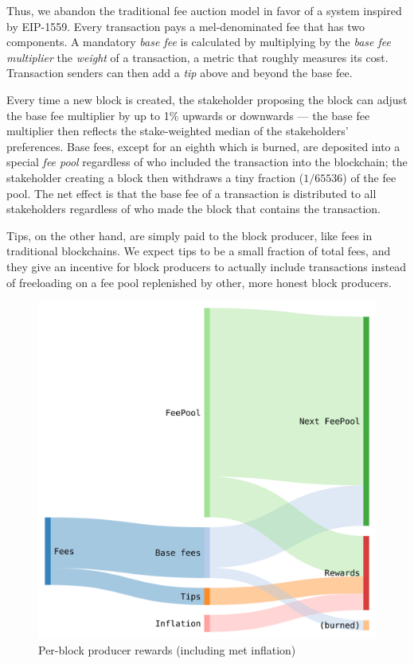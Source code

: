 \documentclass[headinclude]{scrbook}
\begin{document}
Thus, we abandon the traditional fee auction model in favor of a system inspired by EIP-1559. Every transaction pays a mel-denominated fee that has two components. A mandatory \textit{base fee} is calculated by multiplying by the \textit{base fee multiplier} the \textit{weight} of a transaction, a metric that roughly measures its cost. Transaction senders can then add a \textit{tip} above and beyond the base fee.

Every time a new block is created, the stakeholder proposing the block can adjust the base fee multiplier by up to 1\% upwards or downwards --- the base fee multiplier then reflects the stake-weighted median of the stakeholders' preferences. Base fees, except for an eighth which is burned, are deposited into a special \textit{fee pool} regardless of who included the transaction into the blockchain; the stakeholder creating a block then withdraws a tiny fraction ($1/65536$) of the fee pool. The net effect is that the base fee of a transaction is distributed to all stakeholders regardless of who made the block that contains the transaction. 

Tips, on the other hand, are simply paid to the block producer, like fees in traditional blockchains. We expect tips to be a small fraction of total fees, and they give an incentive for block producers to actually include transactions instead of freeloading on a fee pool replenished by other, more honest block producers.

\begin{figure}
    \centering \includegraphics[width=\linewidth]{fees.png}
    \caption{Per-block producer rewards (including met inflation)}
    \label{fig:fees}
\end{figure}
\end{document}
